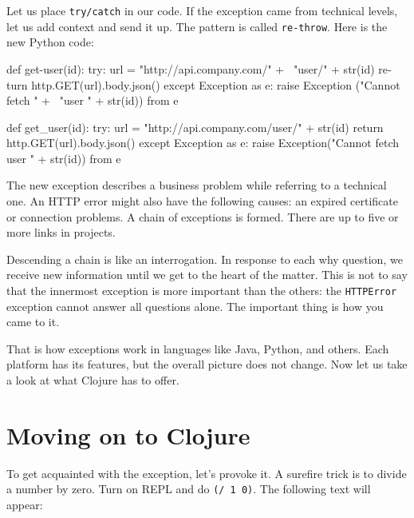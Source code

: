 Let us place \verb|try/catch| in our code. If the exception came from technical levels, let us add context and send it up. The pattern is called \verb|re-throw|. Here is the new Python code:

\ifx\DEVICETYPE\MOBILE

\begin{english}
  \begin{python}
def get-user(id):
  try:
    url = "http://api.company.com/" + \
          "user/" + str(id)
    return http.GET(url).body.json()
  except Exception as e:
    raise Exception ("Cannot fetch " + \
          "user " + str(id)) from e
  \end{python}
\end{english}

\else

\begin{english}
  \begin{js}
def get_user(id):
  try:
    url = "http://api.company.com/user/" + str(id)
    return http.GET(url).body.json()
  except Exception as e:
    raise Exception("Cannot fetch user " + str(id)) from e

  \end{js}
\end{english}

\fi


The new exception describes a business problem while referring to a technical one. An HTTP error might also have the following causes: an expired certificate or connection problems. A chain of exceptions is formed. There are up to five or more links in projects.

Descending a chain is like an interrogation. In response to each why question, we receive new information until we get to the heart of the matter. This is not to say that the innermost exception is more important than the others: the \verb|HTTPError| exception cannot answer all questions alone. The important thing is how you came to it.

That is how exceptions work in languages like Java, Python, and others. Each platform has its features, but the overall picture does not change. Now let us take a look at what Clojure has to offer.

\section{Moving on to Clojure}

To get acquainted with the exception, let's provoke it. A surefire trick is to divide a number by zero. Turn on REPL and do \verb|(/ 1 0)|. The following text will appear: 

